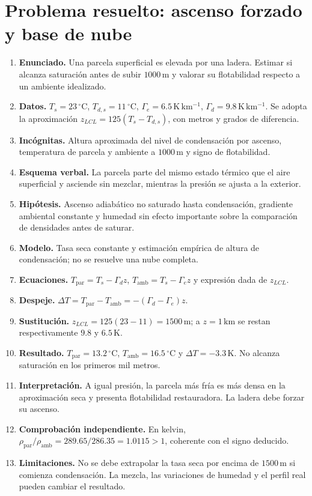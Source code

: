\section{Problema resuelto: ascenso forzado y base de nube}
\begin{enumerate}
\item \textbf{Enunciado.} Una parcela superficial es elevada por una ladera. Estimar si alcanza saturación antes de subir $1000\,\mathrm{m}$ y valorar su flotabilidad respecto a un ambiente idealizado.
\item \textbf{Datos.} $T_s=23\,{}^\circ\mathrm{C}$, $T_{d,s}=11\,{}^\circ\mathrm{C}$, $\Gamma_e=6.5\,\mathrm{K\,km^{-1}}$, $\Gamma_d=9.8\,\mathrm{K\,km^{-1}}$. Se adopta la aproximación $z_{LCL}=125(T_s-T_{d,s})$, con metros y grados de diferencia.
\item \textbf{Incógnitas.} Altura aproximada del nivel de condensación por ascenso, temperatura de parcela y ambiente a $1000\,\mathrm{m}$ y signo de flotabilidad.
\item \textbf{Esquema verbal.} La parcela parte del mismo estado térmico que el aire superficial y asciende sin mezclar, mientras la presión se ajusta a la exterior.
\item \textbf{Hipótesis.} Ascenso adiabático no saturado hasta condensación, gradiente ambiental constante y humedad sin efecto importante sobre la comparación de densidades antes de saturar.
\item \textbf{Modelo.} Tasa seca constante y estimación empírica de altura de condensación; no se resuelve una nube completa.
\item \textbf{Ecuaciones.} $T_{\mathrm{par}}=T_s-\Gamma_d z$, $T_{\mathrm{amb}}=T_s-\Gamma_e z$ y expresión dada de $z_{LCL}$.
\item \textbf{Despeje.} $\Delta T=T_{\mathrm{par}}-T_{\mathrm{amb}}=-(\Gamma_d-\Gamma_e)z$.
\item \textbf{Sustitución.} $z_{LCL}=125(23-11)=1500\,\mathrm{m}$; a $z=1\,\mathrm{km}$ se restan respectivamente $9.8$ y $6.5\,\mathrm{K}$.
\item \textbf{Resultado.} $T_{\mathrm{par}}=13.2\,{}^\circ\mathrm{C}$, $T_{\mathrm{amb}}=16.5\,{}^\circ\mathrm{C}$ y $\Delta T=-3.3\,\mathrm{K}$. No alcanza saturación en los primeros mil metros.
\item \textbf{Interpretación.} A igual presión, la parcela más fría es más densa en la aproximación seca y presenta flotabilidad restauradora. La ladera debe forzar su ascenso.
\item \textbf{Comprobación independiente.} En kelvin, $\rho_{\mathrm{par}}/\rho_{\mathrm{amb}}=289.65/286.35=1.0115>1$, coherente con el signo deducido.
\item \textbf{Limitaciones.} No se debe extrapolar la tasa seca por encima de $1500\,\mathrm{m}$ si comienza condensación. La mezcla, las variaciones de humedad y el perfil real pueden cambiar el resultado.
\end{enumerate}

